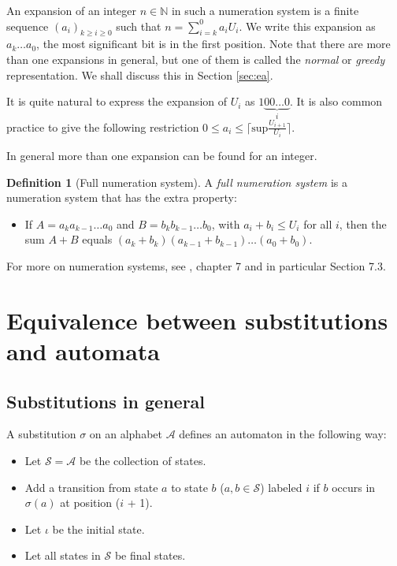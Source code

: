 \documentclass{article}
\theoremstyle{definition}
\newtheorem{definition}[theorem]{Definition}
\begin{document}
An expansion of an integer $n \in \mathbb{N}$ in such a numeration system is
a finite sequence $(a_i)_{k \ge i \ge 0}$ such that 
$n = \sum_{i = k}^0 a_i U_i$. We write this expansion as $a_k \ldots a_0$, the
most significant bit is in the first position. Note that there are more than
one expansions in general, but one of them is called the \emph{normal} or
\emph{greedy} representation. We shall discuss this in Section \ref{sec:ea}.

It is quite natural to express the expansion of $U_i$ as
$1\underbrace{00\ldots0}_i$. It is also common practice to give the following
restriction $0 \le a_i \le \lceil\mathrm{sup}\frac{U_{i + 1}}{U_i}\rceil$.

In general more than one expansion can be found for an integer.

\begin{definition}[Full numeration system] \label{def:full_numeration_system}
A \emph{full numeration system} is a numeration system that has the extra
property: 
\begin{itemize}
\item If $A = a_k a_{k - 1} \ldots a_0$ and $B = b_k b_{k - 1} \ldots b_0$, 
with $a_i + b_i \le U_i$ for all $i$, then the sum $A + B$ equals 
$(a_k + b_k) (a_{k - 1} + b_{k - 1}) \ldots (a_0 + b_0)$.
\end{itemize}
\end{definition}

For more on numeration systems, see \cite{Loth}, chapter 7 and in particular
Section 7.3.

\section{Equivalence between substitutions and automata}
\subsection{Substitutions in general}
A substitution $\sigma$ on an alphabet $\mathcal{A}$ defines an automaton in 
the following way:
\begin{itemize}
\item Let $\mathcal{S} = \mathcal{A}$ be the collection of states.
\item Add a transition from state $a$ to state $b$ ($a,b \in \mathcal{S}$) 
labeled $i$ if $b$ occurs in $\sigma(a)$ at position ($i$ + 1).
\item Let $\iota$ be the initial state.
\item Let all states in $\mathcal{S}$ be final states.
\end{itemize}
\end{document}
